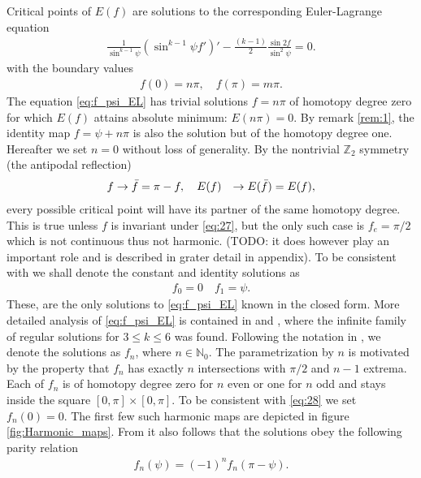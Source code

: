 Critical points of $E(f)$ are solutions to the corresponding
Euler-Lagrange equation
\begin{align}
  \label{eq:f_psi_EL} \frac{1}{\sin^{k-1}\psi}\left(\sin^{k-1}\psi
    f'\right)'-\frac{(k-1)}{2}\frac{\sin2f}{\sin^2\psi}=0.
\end{align}
with the boundary values
\begin{align}
  \label{eq:25} f(0)=n\pi,\quad f(\pi)=m\pi.
\end{align}
The equation \eqref{eq:f_psi_EL} has trivial solutions $f=n\pi$ of
homotopy degree zero for which $E(f)$ attains absolute minimum:
$E(n\pi)=0$. By remark \ref{rem:1}, the identity map $f=\psi+n\pi$ is
also the solution but of the homotopy degree one.  Hereafter we set
$n=0$ without loss of generality.
By the nontrivial $\mathbb{Z}_2$ symmetry (the antipodal
reflection)
\begin{align}
  \label{eq:27}
  f&\rightarrow \bar{f}=\pi-f,\quad
  E(f)&\rightarrow E(\bar{f})=E(f),
\end{align}
every possible critical point will have its partner of the same
homotopy degree. This is true unless $f$ is invariant under
\eqref{eq:27}, but the only such case is $f_e=\pi/2$ which is not
continuous thus not harmonic. (TODO: it does however play an important
role and is described in grater detail in appendix). To be consistent
with \cite{Bizon1997} we shall denote the constant and identity
solutions as
\begin{align}
  \label{eq:28}
  f_0=0\quad f_1=\psi.
\end{align}
These, are the only solutions to \eqref{eq:f_psi_EL} known in the
closed form. More detailed analysis of \eqref{eq:f_psi_EL} is
contained in \cite{Bizon1997} and \cite{Corlette2001}, where the
infinite family of regular solutions for $3\le k\le6$ was
found. Following the notation in \cite{Bizon1997}, we denote the
solutions as $f_n$, where $n\in\mathbb{N}_0$. The parametrization by
$n$ is motivated by the property that $f_n$ has exactly $n$
intersections with $\pi/2$ and $n-1$ extrema. Each of $f_n$ is of
homotopy degree zero for $n$ even or one for $n$ odd and stays inside
the square $[0,\pi]\times[0,\pi]$. To be consistent with \eqref{eq:28}
we set $f_n(0)=0$. The first few such harmonic maps are depicted in
figure \ref{fig:Harmonic_maps}. From \cite{Bizon1997} it also follows
that the solutions obey the following parity relation
\begin{align}
  \label{eq:29}
  f_n(\psi)=(-1)^n f_n(\pi-\psi).
\end{align}

